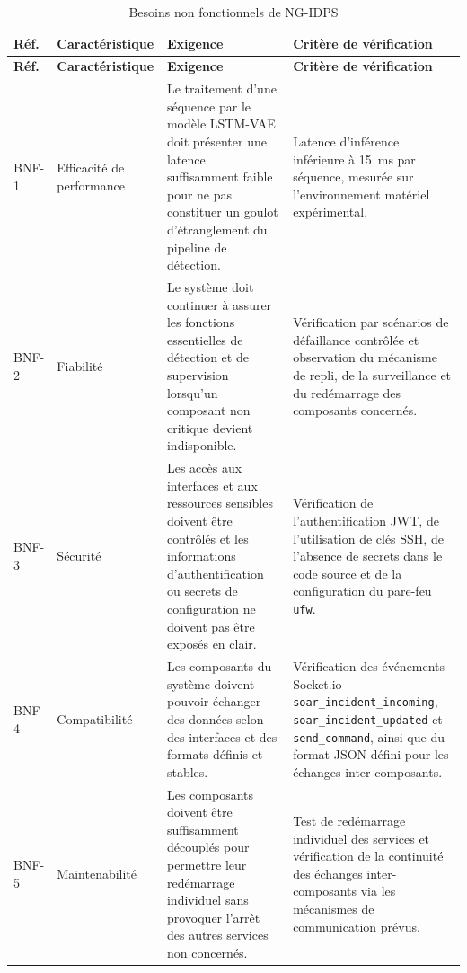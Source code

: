 \renewcommand{\arraystretch}{1.25}
\small
\begin{xltabular}{\textwidth}{|l|l|>{\raggedright\arraybackslash}X|>{\raggedright\arraybackslash}X|}

\caption{Besoins non fonctionnels de NG-IDPS}
\label{tab:bnf_ng_idps} \\

\hline
{}
\textbf{Réf.} & \textbf{Caractéristique} & \textbf{Exigence} & \textbf{Critère de vérification} \\ \hline
\endfirsthead

\hline
{}
\textbf{Réf.} & \textbf{Caractéristique} & \textbf{Exigence} & \textbf{Critère de vérification} \\ \hline
\endhead

BNF-1 & Efficacité de performance &
Le traitement d'une séquence par le modèle LSTM-VAE doit présenter une latence suffisamment faible pour ne pas constituer un goulot d'étranglement du pipeline de détection. &
Latence d'inférence inférieure à 15~ms par séquence, mesurée sur l'environnement matériel expérimental. \\ \hline

BNF-2 & Fiabilité &
Le système doit continuer à assurer les fonctions essentielles de détection et de supervision lorsqu'un composant non critique devient indisponible. &
Vérification par scénarios de défaillance contrôlée et observation du mécanisme de repli, de la surveillance et du redémarrage des composants concernés. \\ \hline

BNF-3 & Sécurité &
Les accès aux interfaces et aux ressources sensibles doivent être contrôlés et les informations d'authentification ou secrets de configuration ne doivent pas être exposés en clair. &
Vérification de l'authentification JWT, de l'utilisation de clés SSH, de l'absence de secrets dans le code source et de la configuration du pare-feu \texttt{ufw}. \\ \hline

BNF-4 & Compatibilité &
Les composants du système doivent pouvoir échanger des données selon des interfaces et des formats définis et stables. &
Vérification des événements Socket.io \texttt{soar\_incident\_incoming}, \texttt{soar\_incident\_updated} et \texttt{send\_command}, ainsi que du format JSON défini pour les échanges inter-composants. \\ \hline

BNF-5 & Maintenabilité &
Les composants doivent être suffisamment découplés pour permettre leur redémarrage individuel sans provoquer l'arrêt des autres services non concernés. &
Test de redémarrage individuel des services et vérification de la continuité des échanges inter-composants via les mécanismes de communication prévus. \\ \hline


\end{xltabular}
